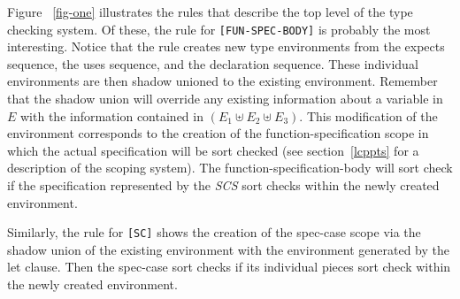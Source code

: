 \documentclass[12pt]{article} %
\newcommand{\RULELAB}[1]{\texttt{#1}}
\begin{document}
Figure ~\ref{fig-one} illustrates the rules that describe the top
level of the type checking system. Of these, the rule for
\RULELAB{[FUN-SPEC-BODY]} is probably the most interesting. Notice
that the rule creates new type environments from the expects sequence,
the uses sequence, and the declaration sequence. These individual
environments are then shadow unioned to the existing
environment. Remember that the shadow union will override any existing
information about a variable in $E$ with the information contained in
$(E_1 \uplus E_2 \uplus E_3)$. This modification of the environment
corresponds to the creation of the function-specification scope in
which the actual specification will be sort checked (see
section~\ref{lcppts} for a description of the scoping system). The
function-specification-body will sort check if the specification
represented by the \textit{SCS} sort checks within the newly created
environment.

Similarly, the rule for \RULELAB{[SC]} shows the creation of the
spec-case scope via the shadow union of the existing environment with
the environment generated by the let clause. Then the spec-case sort
checks if its individual pieces sort check within the newly created
environment.
\end{document}
